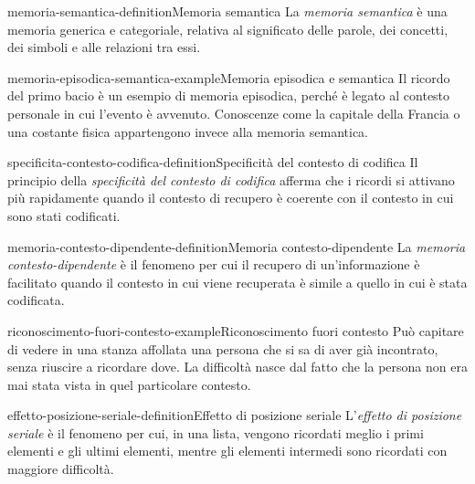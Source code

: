 \documentclass[preview]{standalone}
\begin{document}
\begin{snippetdefinition}{memoria-semantica-definition}{Memoria semantica}
    La \emph{memoria semantica} è una memoria generica e categoriale, relativa
    al significato delle parole, dei concetti, dei simboli e alle relazioni tra
    essi.
\end{snippetdefinition}

\begin{snippetexample}{memoria-episodica-semantica-example}{Memoria episodica e semantica}
    Il ricordo del primo bacio è un esempio di memoria episodica, perché è
    legato al contesto personale in cui l'evento è avvenuto. Conoscenze come la
    capitale della Francia o una costante fisica appartengono invece alla
    memoria semantica.
\end{snippetexample}

\begin{snippetdefinition}{specificita-contesto-codifica-definition}{Specificità del contesto di codifica}
    Il principio della \emph{specificità del contesto di codifica} afferma che i
    ricordi si attivano più rapidamente quando il contesto di recupero è coerente
    con il contesto in cui sono stati codificati.
\end{snippetdefinition}

\begin{snippetdefinition}{memoria-contesto-dipendente-definition}{Memoria contesto-dipendente}
    La \emph{memoria contesto-dipendente} è il fenomeno per cui il recupero di
    un'informazione è facilitato quando il contesto in cui viene recuperata è
    simile a quello in cui è stata codificata.
\end{snippetdefinition}

\begin{snippetexample}{riconoscimento-fuori-contesto-example}{Riconoscimento fuori contesto}
    Può capitare di vedere in una stanza affollata una persona che si sa di aver
    già incontrato, senza riuscire a ricordare dove. La difficoltà nasce dal
    fatto che la persona non era mai stata vista in quel particolare contesto.
\end{snippetexample}

\begin{snippetdefinition}{effetto-posizione-seriale-definition}{Effetto di posizione seriale}
    L'\emph{effetto di posizione seriale} è il fenomeno per cui, in una lista,
    vengono ricordati meglio i primi elementi e gli ultimi elementi, mentre gli
    elementi intermedi sono ricordati con maggiore difficoltà.
\end{snippetdefinition}
\end{document}
